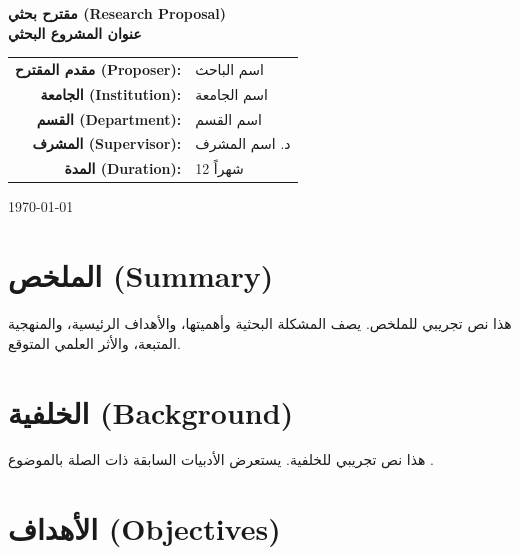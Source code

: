 \documentclass[11pt,a4paper]{article}
\begin{document}
\thispagestyle{empty}
\begin{center}
\vspace*{2cm}
{\LARGE\bfseries مقترح بحثي (Research Proposal)}\\[1.5em]
{\Large\bfseries عنوان المشروع البحثي}\\[2em]

\begin{tabular}{rl}
\textbf{مقدم المقترح (Proposer):} & اسم الباحث \\
\textbf{الجامعة (Institution):} & اسم الجامعة \\
\textbf{القسم (Department):} & اسم القسم \\
\textbf{المشرف (Supervisor):} & د. اسم المشرف \\
\textbf{المدة (Duration):} & 12 شهراً \\
\end{tabular}

\vspace{2em}
{\large \today}
\end{center}

\newpage

\section{الملخص (Summary)}
\label{sec:summary}

هذا نص تجريبي للملخص. يصف المشكلة البحثية وأهميتها، والأهداف الرئيسية، والمنهجية المتبعة، والأثر العلمي المتوقع.

\section{الخلفية (Background)}
\label{sec:background}

هذا نص تجريبي للخلفية. يستعرض الأدبيات السابقة ذات الصلة بالموضوع \cite{example_book}.

\section{الأهداف (Objectives)}
\label{sec:objectives}
\end{document}
